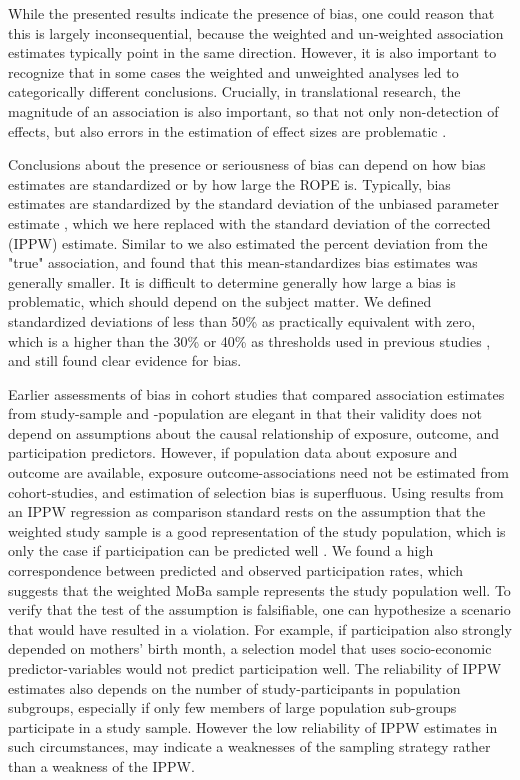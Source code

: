 \documentclass[12pt]{article}
\begin{document}
While the presented results indicate the presence of bias, one could reason that this is largely inconsequential, because the weighted and un-weighted association estimates typically point in the same direction. However, it is also important to recognize that in some cases the weighted and unweighted analyses led to categorically different conclusions. Crucially, in translational research, the magnitude of an association is also important, so that not only non-detection of effects, but also errors in the estimation of effect sizes are problematic \cite{Sullivan2012-uc}.

Conclusions about the presence or seriousness of bias can depend on how bias estimates are standardized or by how large the ROPE is. Typically, bias estimates are standardized by the standard deviation of the unbiased parameter estimate \cite{Stuart2010-cj}, which we here replaced with the standard deviation of the corrected (IPPW) estimate. Similar to \citeauthor{Nilsen2009-ci} \cite{Nilsen2009-ci} we also estimated the percent deviation from the "true" association, and found that this mean-standardizes bias estimates was generally smaller. It is difficult to determine generally how large a bias is problematic, which should depend on the subject matter. We defined standardized deviations of less than 50\%  as practically equivalent with zero, which is a higher than the 30\% or 40\% as thresholds used in previous studies \cite{Greene2011-am, Stuart2010-cj}, and still found clear evidence for bias.

Earlier assessments of bias in cohort studies that compared association estimates from study-sample and -population are elegant in that their validity does not depend on assumptions about the causal relationship of exposure, outcome, and participation predictors. However, if population data about exposure and outcome are available, exposure outcome-associations need not be estimated from cohort-studies, and estimation of selection bias is superfluous. Using results from an IPPW regression as comparison standard rests on the assumption that the weighted study sample is a good representation of the study population, which is only the case if participation can be predicted well \cite{Seaman2013-rj}. We found a high correspondence between predicted and observed participation rates, which suggests that the weighted MoBa sample represents the study population well. To verify that the test of the assumption is falsifiable, one can hypothesize a scenario that would have resulted in a violation. For example, if participation also strongly depended on mothers' birth month, a selection model that uses socio-economic predictor-variables would not predict participation well. The reliability of IPPW estimates also depends on the number of study-participants in population subgroups, especially if only few members of large population sub-groups participate in a study sample. However the low reliability of IPPW estimates in such circumstances, may indicate a weaknesses of the sampling strategy rather than a weakness of the IPPW.
\end{document}
